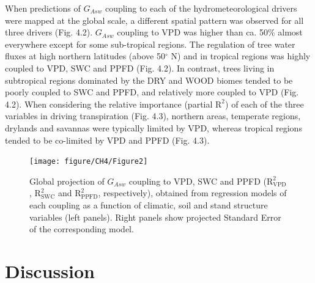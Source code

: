 \documentclass[11pt,twoside]{reedthesis}
\begin{document}
When predictions of \(G_{Asw}\) coupling to each of the
hydrometeorological drivers were mapped at the global scale, a different
spatial pattern was observed for all three drivers (Fig. 4.2).
\(G_{Asw}\) coupling to VPD was higher than ca. 50\% almost everywhere
except for some sub-tropical regions. The regulation of tree water
fluxes at high northern latitudes (above 50\(^{\circ}\) N) and in
tropical regions was highly coupled to VPD, SWC and PPFD (Fig. 4.2). In
contrast, trees living in subtropical regions dominated by the DRY and
WOOD biomes tended to be poorly coupled to SWC and PPFD, and relatively
more coupled to VPD (Fig. 4.2). When considering the relative importance
(partial \(\text{R}^2\)) of each of the three variables in driving
transpiration (Fig. 4.3), northern areas, temperate regions, drylands
and savannas were typically limited by VPD, whereas tropical regions
tended to be co-limited by VPD and PPFD (Fig. 4.3).\par
\begin{figure}[hbt!]

{\centering \texttt{[image: figure/CH4/Figure2]} 

}

\caption[Global projection of $G_{Asw}$ coupling to VPD, SWC and PPFD.]{Global projection of $G_{Asw}$ coupling to VPD, SWC and PPFD ($\text{R}^2_{\text{VPD}}$, $\text{R}^2_{\text{SWC}}$ and $\text{R}^2_{\text{PPFD}}$, respectively), obtained from regression models of each coupling as a function of climatic, soil and stand structure variables (left panels). Right panels show projected Standard Error of the corresponding model.}\label{fig:ch4fig2}
\end{figure}
\section{Discussion}\label{discussion}
\end{document}

